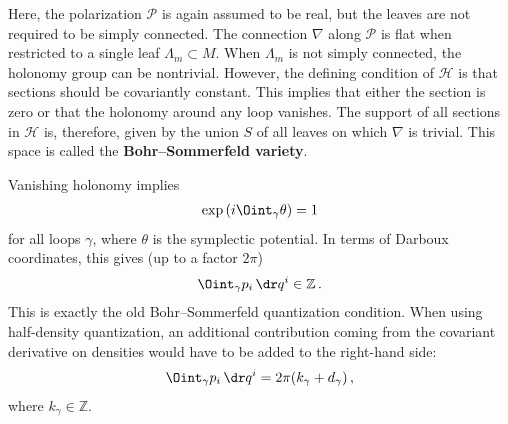     \begin{method}
        Here, the polarization $\mathcal{P}$ is again assumed to be real, but the leaves are not required to be simply connected. The connection $\nabla$ along $\mathcal{P}$ is flat when restricted to a single leaf $\Lambda_m\subset M$. When $\Lambda_m$ is not simply connected, the holonomy group can be nontrivial. However, the defining condition of $\mathcal{H}$ is that sections should be covariantly constant. This implies that either the section is zero or that the holonomy around any loop vanishes. The support of all sections in $\mathcal{H}$ is, therefore, given by the union $S$ of all leaves on which $\nabla$ is trivial. This space is called the \textbf{Bohr--Sommerfeld variety}.

        Vanishing holonomy implies
        \begin{gather}
            \exp\left(i\Oint_\gamma\theta\right) = 1
        \end{gather}
        for all loops $\gamma$, where $\theta$ is the symplectic potential. In terms of Darboux coordinates, this gives (up to a factor $2\pi$)
        \begin{gather}
            \Oint_\gamma p_i\,\dr q^i\in\mathbb{Z}\,.
        \end{gather}
        This is exactly the old Bohr--Sommerfeld quantization condition. When using half-density quantization, an additional contribution coming from the covariant derivative on densities would have to be added to the right-hand side:
        \begin{gather}
            \Oint_\gamma p_i\,\dr q^i = 2\pi(k_\gamma + d_\gamma)\,,
        \end{gather}
        where $k_\gamma\in\mathbb{Z}$.
    \end{method}

